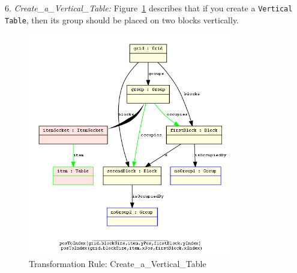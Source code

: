 6. \textit{Create\_a\_Vertical\_Table: } Figure~\ref{fig:TR_Create_a_Vertical_Table} describes that if you create a \texttt{Vertical Table}, then its group should be placed on two blocks vertically.

\begin{figure}[h]
	\centering
	\includegraphics[width=0.8\textwidth]{figures/TR_Create_a_Vertical_Table}
	\caption{Transformation Rule: Create\_a\_Vertical\_Table}
	\label{fig:TR_Create_a_Vertical_Table}
\end{figure}
